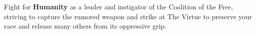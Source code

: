 \begin{center}
\begin{minipage}[c]{1in}
\end{minipage}%
\hspace{2em}%
\begin{minipage}[c]{4in}
  Fight for \textbf{Humanity} as a leader and instigator of the
  Coalition of the Free, striving to capture the rumored weapon and
  strike at The Virtue to preserve your race and release many others
  from its oppressive grip.
\end{minipage}

\bigskip
  

\end{center}
